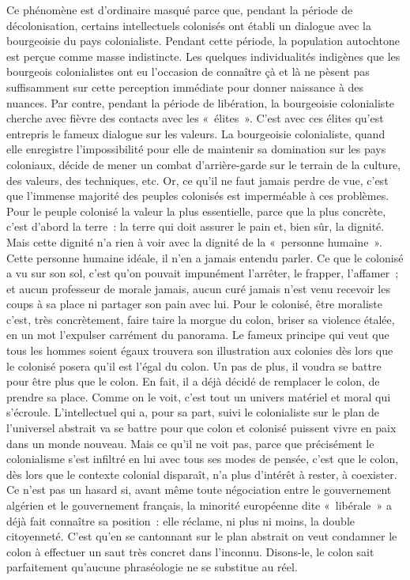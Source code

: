\documentclass[french,twoside]{book} %
\begin{document}
\bigbreak
\noindent Ce phénomène est d’ordinaire masqué parce que, pendant la période de décolonisation, certains intellectuels colonisés ont établi un dialogue avec la bourgeoisie du pays colonialiste. Pendant cette période, la population autochtone est perçue comme masse indistincte. Les quelques individualités indigènes   que les bourgeois colonialistes ont eu l’occasion de connaître çà et là ne pèsent pas suffisamment sur cette perception immédiate pour donner naissance à des nuances. Par contre, pendant la période de libération, la bourgeoisie colonialiste cherche avec fièvre des contacts avec les « élites ». C’est avec ces élites qu’est entrepris le fameux dialogue sur les valeurs. La bourgeoisie colonialiste, quand elle enregistre l’impossibilité pour elle de maintenir sa domination sur les pays coloniaux, décide de mener un combat d’arrière-garde sur le terrain de la culture, des valeurs, des techniques, etc. Or, ce qu’il ne faut jamais perdre de vue, c’est que l’immense majorité des peuples colonisés est imperméable à ces problèmes. Pour le peuple colonisé la valeur la plus essentielle, parce que la plus concrète, c’est d’abord la terre : la terre qui doit assurer le pain et, bien sûr, la dignité. Mais cette dignité n’a rien à voir avec la dignité de la « personne humaine ». Cette personne humaine idéale, il n’en a jamais entendu parler. Ce que le colonisé a vu sur son sol, c’est qu’on pouvait impunément l’arrêter, le frapper, l’affamer ; et aucun professeur de morale jamais, aucun curé jamais n’est venu recevoir les coups à sa place ni partager son pain avec lui. Pour le colonisé, être moraliste c’est, très concrètement, faire taire la morgue du colon, briser sa violence étalée, en un mot l’expulser carrément du panorama. Le fameux principe qui veut que tous les hommes soient égaux trouvera son illustration aux colonies dès lors que le colonisé posera qu’il est l’égal du colon. Un pas de plus, il voudra se battre pour être plus que le colon. En fait, il a déjà décidé de remplacer le colon, de prendre sa place. Comme on le voit, c’est tout un univers matériel et moral qui s’écroule. L’intellectuel qui a, pour sa part, suivi le colonialiste sur le plan de l’universel abstrait va se battre pour que colon et colonisé puissent vivre en paix dans un monde nouveau. Mais ce qu’il ne voit pas, parce que précisément le colonialisme s’est infiltré en lui avec tous ses modes de pensée, c’est que le colon, dès lors que le contexte colonial disparaît, n’a plus d’intérêt à rester, à coexister. Ce n’est pas un hasard si, avant même toute négociation entre le gouvernement algérien et le gouvernement   français, la minorité européenne dite « libérale » a déjà fait connaître sa position : elle réclame, ni plus ni moins, la double citoyenneté. C’est qu’en se cantonnant sur le plan abstrait on veut condamner le colon à effectuer un saut très concret dans l’inconnu. Disons-le, le colon sait parfaitement qu’aucune phraséologie ne se substitue au réel.\par
\end{document}
